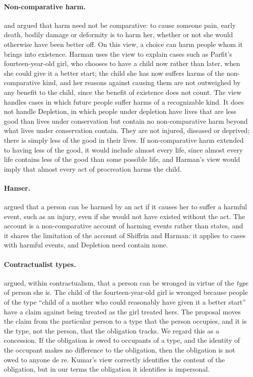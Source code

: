 \documentclass{situationist-preprint}
\begin{document}
\paragraph{Non-comparative harm.} \citet{Shiffrin1999} and \citet{Harman2004} argued that harm need not be comparative: to cause someone pain, early death, bodily damage or deformity is to harm her, whether or not she would otherwise have been better off. On this view, a choice can harm people whom it brings into existence. Harman uses the view to explain cases such as Parfit's fourteen-year-old girl, who chooses to have a child now rather than later, when she could give it a better start; the child she has now suffers harms of the non-comparative kind, and her reasons against causing them are not outweighed by any benefit to the child, since the benefit of existence does not count. The view handles cases in which future people suffer harms of a recognizable kind. It does not handle Depletion, in which people under depletion have lives that are less good than lives under conservation but contain no non-comparative harm beyond what lives under conservation contain. They are not injured, diseased or deprived; there is simply less of the good in their lives. If non-comparative harm extended to having less of the good, it would include almost every life, since almost every life contains less of the good than some possible life, and Harman's view would imply that almost every act of procreation harms the child.

\paragraph{Hanser.} \citet{Hanser1990} argued that a person can be harmed by an act if it causes her to suffer a harmful event, such as an injury, even if she would not have existed without the act. The account is a non-comparative account of harming events rather than states, and it shares the limitation of the account of Shiffrin and Harman: it applies to cases with harmful events, and Depletion need contain none.

\paragraph{Contractualist types.} \citet{Kumar2003} argued, within contractualism, that a person can be wronged in virtue of the \emph{type} of person she is. The child of the fourteen-year-old girl is wronged because people of the type ``child of a mother who could reasonably have given it a better start'' have a claim against being treated as the girl treated hers. The proposal moves the claim from the particular person to a type that the person occupies, and it is the type, not the person, that the obligation tracks. We regard this as a concession. If the obligation is owed to occupants of a type, and the identity of the occupant makes no difference to the obligation, then the obligation is not owed to anyone de re. Kumar's view correctly identifies the content of the obligation, but in our terms the obligation it identifies is impersonal.
\end{document}
